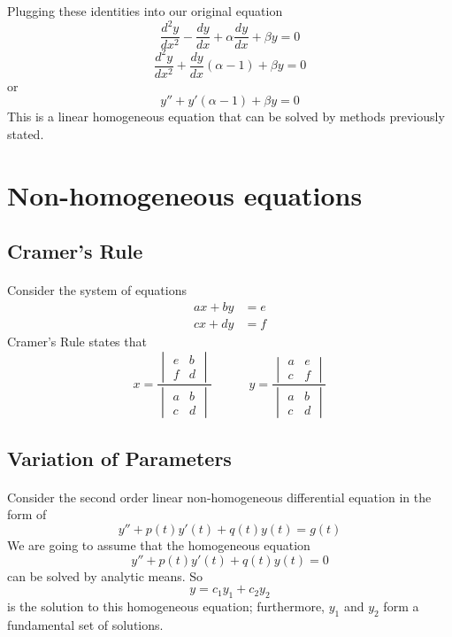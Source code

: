 \documentclass[font =22]{report}
\begin{document}
Plugging these identities into our original equation 
\[
\frac{d^2y}{dx^2}-\frac{dy}{dx} + \alpha\frac{dy}{dx}+\beta y = 0
\]
\[
\frac{d^2y}{dx^2}+\frac{dy}{dx}\left(\alpha - 1\right)+\beta y = 0
\]
or
\[
y''+y'(\alpha-1) + \beta y = 0
\]
This is a linear homogeneous equation that can be solved by methods previously stated.

\section{ Non-homogeneous equations}
\subsection{Cramer's Rule}
\paragraph{}
Consider the system of equations 
\begin{align*}
ax+by &= e\\
cx+dy &= f
\end{align*}
Cramer's Rule states that 
\[
x = \frac{
\begin{vmatrix}
e&b\\
f&d
\end{vmatrix}
}{
\begin{vmatrix}
a&b\\
c&d

\end{vmatrix}
}
\quad \quad \quad
y = \frac{
\begin{vmatrix}
a&e\\
c&f
\end{vmatrix}
}{
\begin{vmatrix}
a&b\\
c&d

\end{vmatrix}
}
\]

\subsection{Variation of Parameters}
\paragraph*{}
Consider the second order linear non-homogeneous differential equation in the form of 
\[
y''+p(t)y'(t)+q(t)y(t) = g(t)
\] 
We are going to assume that the homogeneous equation 
\[
y''+p(t)y'(t)+q(t)y(t) = 0 
\]
can be solved by analytic means. So
\[
y = c_1y_1+c_2y_2 
\]
is the solution to this homogeneous equation; furthermore,  $y_1$ and $y_2$ form a fundamental set of solutions.
\end{document}
